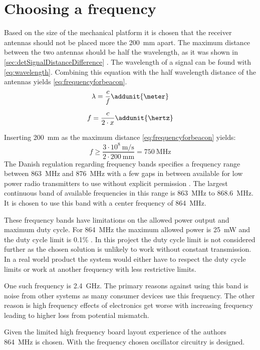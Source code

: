 \section{Choosing a frequency} \label{sec:choosing_a_frequency}
Based on the size of the mechanical platform it is chosen that the receiver antennas should not be placed more the \SI{200}{\milli\meter} apart. The maximum distance between the two antennas should be half the wavelength, as it was shown in \autoref{sec:detSignalDistanceDifference} \citep{TechReport:Amundson2010,TechReport:DirectionFindingPaper}. The wavelength of a signal can be found with \autoref{eq:wavelength}. Combining this equation with the half wavelength distance of the antennas yields \autoref{eq:frequencyforbeacon}. 
\begin{equation} 
\lambda = \frac{c}{f} \addunit{\meter} \label{eq:wavelength}
\end{equation}
\startexplain
{}
\stopexplain

\begin{align} \label{eq:frequencyforbeacon}
f = \frac{c}{2 \cdot x} \addunit{\hertz} 
\end{align}
\startexplain
{}
\stopexplain

Inserting \SI{200}{\milli\meter} as the maximum distance \autoref{eq:frequencyforbeacon} yields:
\begin{equation}
f \geq \frac{3\cdot 10^8~\si{\meter\per\second}}{2 \cdot \SI{200}{\milli\meter}} = \SI{750}{\mega\hertz}
\end{equation}
The Danish regulation regarding frequency bands specifies a frequency range between \SI{863}{\mega\hertz} and \SI{876}{\mega\hertz} with a few gaps in between available for low power radio transmitters to use without explicit permission \citep{web:RegulationFreq}. The largest continuous band of available frequencies in this range is \SI{863}{\mega\hertz} to \SI{868.6}{\mega\hertz}. It is chosen to use this band with a center frequency of \SI{864}{\mega\hertz}.

These frequency bands have limitations on the allowed power output and maximum duty cycle. For \SI{864}{\mega\hertz} the maximum allowed power is \SI{25}{\milli\watt} and the duty cycle limit is 0.1\% \citep{web:RegulationFreq869}. In this project the duty cycle limit is not considered further as the chosen solution is unlikely to work without constant transmission. In a real world product the system would either have to respect the duty cycle limits or work at another frequency with less restrictive limits.

One such frequency is \SI{2.4}{\giga\hertz}. The primary reasons against using this band is noise from other systems as many consumer devices use this frequency. The other reason is high frequency effects of electronics get worse with increasing frequency leading to higher loss from potential mismatch. 

Given the limited high frequency board layout experience of the authors \SI{864}{\mega\hertz} is chosen. With the frequency chosen oscillator circuitry is designed.